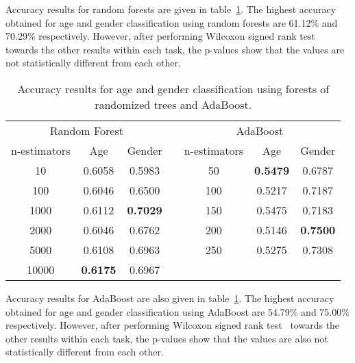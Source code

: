 \documentclass[a4paper]{llncs}
\begin{document}
Accuracy results for random forests are given in table~\ref{table:RandomForestsAndAdaBoost}. The highest accuracy obtained for age and gender classification using random forests are 61.12\% and 70.29\% respectively. However, after performing Wilcoxon signed rank test~\cite{wilcoxon1945individual} towards the other results within each task, the p-values show that the values are not statistically different from each other.  



\begin{table}[!htbp]
\centering
\begin{tabular}{|c|cc|l|c|cc|}
\cline{1-3} \cline{5-7}
\multicolumn{3}{|c|}{Random Forest}              &  & \multicolumn{3}{c|}{AdaBoost}                    \\ \cline{1-3} \cline{5-7} 
n-estimators & Age             & Gender          &  & n-estimators & Age             & Gender          \\ \cline{1-3} \cline{5-7} 
10           & 0.6058          & 0.5983          &  & 50           & \textbf{0.5479} & 0.6787          \\ %
100          & 0.6046          & 0.6500          &  & 100          & 0.5217          & 0.7187          \\ %
1000         & 0.6112          & \textbf{0.7029} &  & 150          & 0.5475          & 0.7183          \\ %
2000         & 0.6046          & 0.6762          &  & 200          & 0.5146          & \textbf{0.7500} \\ %
5000         & 0.6108          & 0.6963          &  & 250          & 0.5275          & 0.7308          \\ %
10000        & \textbf{0.6175} & 0.6967          &  &              &                 &                 \\ \cline{1-3} \cline{5-7} 
\end{tabular}
\caption{Accuracy results for age and gender classification using forests of randomized trees and AdaBoost.}
\label{table:RandomForestsAndAdaBoost}
\end{table}

Accuracy results for AdaBoost are also given in table~\ref{table:RandomForestsAndAdaBoost}. The highest accuracy obtained for age and gender classification using AdaBoost are 54.79\% and 75.00\% respectively. However, after performing Wilcoxon signed rank test~\cite{wilcoxon1945individual} towards the other results within each task, the p-values show that the values are also not statistically different from each other. 
\end{document}
